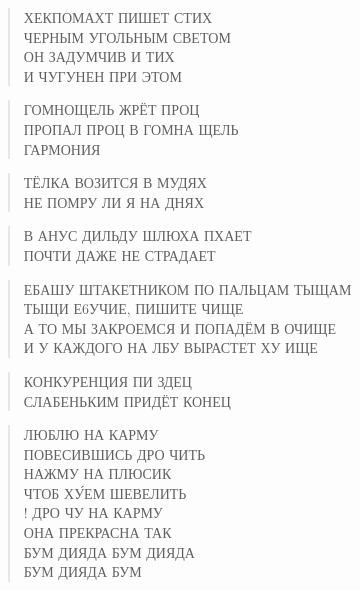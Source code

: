 \poemtitle{***}
\begin{verse}
ХЕКПОМАХТ ПИШЕТ СТИХ\\
ЧЕРНЫМ УГОЛЬНЫМ СВЕТОМ\\
ОН ЗАДУМЧИВ И ТИХ\\
И ЧУГУНЕН ПРИ ЭТОМ
\end{verse}

\poemtitle{***}
\begin{verse}
ГОМНОЩЕЛЬ ЖРЁТ ПРОЦ\\
ПРОПАЛ ПРОЦ В ГОМНА ЩЕЛЬ\\
ГАРМОНИЯ
\end{verse}

\poemtitle{***}
\begin{verse}
ТЁЛКА ВОЗИТСЯ В МУДЯХ\\
НЕ ПОМРУ ЛИ Я НА ДНЯХ
\end{verse}

\poemtitle{***}
\begin{verse}
В АНУС ДИЛЬДУ ШЛЮХА ПХАЕТ\\
ПОЧТИ ДАЖЕ НЕ СТРАДАЕТ
\end{verse}

\poemtitle{***}
\begin{verse}
ЕБАШУ ШТАКЕТНИКОМ ПО ПАЛЬЦАМ ТЫЩАМ\\
ТЫЩИ Е6УЧИЕ, ПИШИТЕ ЧИЩЕ\\
А ТО МЫ ЗАКРОЕМСЯ И ПОПАДЁМ В ОЧИЩЕ\\
И У КАЖДОГО НА ЛБУ ВЫРАСТЕТ ХУ ИЩЕ
\end{verse}

\poemtitle{***}
\begin{verse}
КОНКУРЕНЦИЯ ПИ ЗДЕЦ\\
СЛАБЕНЬКИМ ПРИДЁТ КОНЕЦ
\end{verse}

\poemtitle{***}
\begin{verse}
ЛЮБЛЮ НА КАРМУ\\
ПОВЕСИВШИСЬ ДРО ЧИТЬ\\
НАЖМУ НА ПЛЮСИК\\
ЧТОБ ХУ́ЕМ ШЕВЕЛИТЬ\\!
ДРО ЧУ НА КАРМУ\\
ОНА ПРЕКРАСНА ТАК\\
БУМ ДИЯДА БУМ ДИЯДА\\
БУМ ДИЯДА БУМ
\end{verse}

